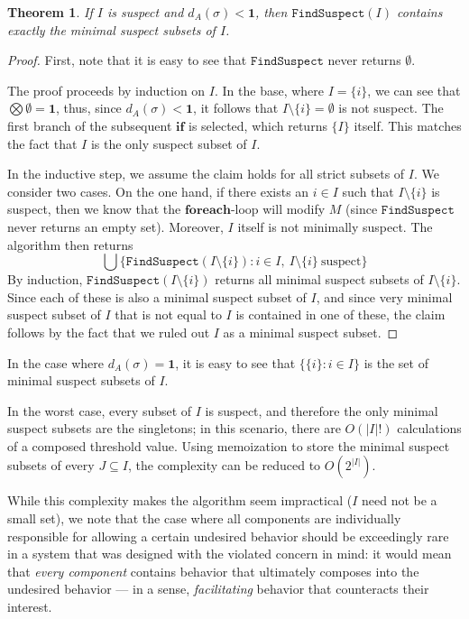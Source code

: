 \documentclass[a4paper]{article}
\newcommand{\cstop}{\mathbf{1}}
\newtheorem{theorem}{Theorem}
\theoremstyle{definition}
\begin{document}
\begin{theorem}%
\label{theorem:minimal-suspect-subsets-correctness}
If $I$ is suspect and $d_A(\sigma) < \cstop$, then $\mathtt{FindSuspect}(I)$ contains exactly the minimal suspect subsets of $I$. 
\end{theorem}
\begin{proof}
First, note that it is easy to see that $\mathtt{FindSuspect}$ never returns $\emptyset$.

The proof proceeds by induction on $I$. In the base, where $I = \{ i \}$, we can see that $\bigotimes \emptyset = \cstop$, thus, since $d_A(\sigma) < \cstop$, it follows that $I \setminus \{ i \} = \emptyset$ is not suspect. The first branch of the subsequent $\mathbf{if}$ is selected, which returns $\{ I \}$ itself. This matches the fact that $I$ is the only suspect subset of $I$.

In the inductive step, we assume the claim holds for all strict subsets of $I$. We consider two cases. On the one hand, if there exists an $i \in I$ such that $I \setminus \{ i \}$ is suspect, then we know that the $\mathbf{foreach}$-loop will modify $M$ (since $\mathtt{FindSuspect}$ never returns an empty set). Moreover, $I$ itself is not minimally suspect. The algorithm then returns 
\[\bigcup \{ \mathtt{FindSuspect}(I \setminus \{ i \}) : i \in I,\ I \setminus \{ i \}\ \mathrm{suspect} \}\]
By induction, $\mathtt{FindSuspect}(I \setminus \{ i \})$ returns all minimal suspect subsets of $I \setminus \{ i \}$. Since each of these is also a minimal suspect subset of $I$, and since very minimal suspect subset of $I$ that is not equal to $I$ is contained in one of these, the claim follows by the fact that we ruled out $I$ as a minimal suspect subset.
\end{proof}
In the case where $d_A(\sigma) = \cstop$, it is easy to see that $\{ \{ i \} : i \in I \}$ is the set of minimal suspect subsets of $I$.

In the worst case, every subset of $I$ is suspect, and therefore the only minimal suspect subsets are the singletons; in this scenario, there are $O(|I|!)$ calculations of a composed threshold value. Using memoization to store the minimal suspect subsets of every $J \subseteq I$, the complexity can be reduced to $O(2^{|I|})$. 

While this complexity makes the algorithm seem impractical ($I$ need not be a small set), we note that the case where all components are individually responsible for allowing a certain undesired behavior should be exceedingly rare in a system that was designed with the violated concern in mind: it would mean that \emph{every component} contains behavior that ultimately composes into the undesired behavior --- in a sense, \emph{facilitating} behavior that counteracts their interest. 
\end{document}

